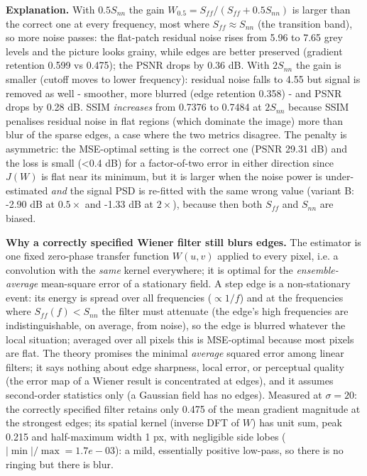 \documentclass[10pt,a4paper]{article}
\begin{document}
\textbf{Explanation.} With $0.5S_{nn}$ the gain $W_{0.5}=S_{ff}/(S_{ff}+0.5S_{nn})$ is larger than the correct one at every frequency, most where $S_{ff}\approx S_{nn}$ (the transition band), so more noise passes: the flat-patch residual noise rises from 5.96 to 7.65 grey levels and the picture looks grainy, while edges are better preserved (gradient retention 0.599 vs 0.475); the PSNR drops by 0.36 dB. With $2S_{nn}$ the gain is smaller (cutoff moves to lower frequency): residual noise falls to 4.55 but signal is removed as well - smoother, more blurred (edge retention 0.358) - and PSNR drops by 0.28 dB. SSIM \textit{increases} from 0.7376 to 0.7484 at $2S_{nn}$ because SSIM penalises residual noise in flat regions (which dominate the image) more than blur of the sparse edges, a case where the two metrics disagree. The penalty is asymmetric: the MSE-optimal setting is the correct one (PSNR 29.31 dB) and the loss is small (\textless{}0.4 dB) for a factor-of-two error in either direction since $J(W)$ is flat near its minimum, but it is larger when the noise power is under-estimated \textit{and} the signal PSD is re-fitted with the same wrong value (variant B: -2.90 dB at $0.5\times$ and -1.33 dB at $2\times$), because then both $S_{ff}$ and $S_{nn}$ are biased.

\textbf{Why a correctly specified Wiener filter still blurs edges.} The estimator is one fixed zero-phase transfer function $W(u,v)$ applied to every pixel, i.e. a convolution with the \textit{same} kernel everywhere; it is optimal for the \textit{ensemble-average} mean-square error of a stationary field. A step edge is a non-stationary event: its energy is spread over all frequencies ($\propto1/f$) and at the frequencies where $S_{ff}(f)<S_{nn}$ the filter must attenuate (the edge's high frequencies are indistinguishable, on average, from noise), so the edge is blurred whatever the local situation; averaged over all pixels this is MSE-optimal because most pixels are flat. The theory promises the minimal \textit{average} squared error among linear filters; it says nothing about edge sharpness, local error, or perceptual quality (the error map of a Wiener result is concentrated at edges), and it assumes second-order statistics only (a Gaussian field has no edges). Measured at $\sigma=20$: the correctly specified filter retains only 0.475 of the mean gradient magnitude at the strongest edges; its spatial kernel (inverse DFT of $W$) has unit sum, peak 0.215 and half-maximum width 1 px, with negligible side lobes ($|\min|/\max=1.7e-03$): a mild, essentially positive low-pass, so there is no ringing but there is blur.
\end{document}
